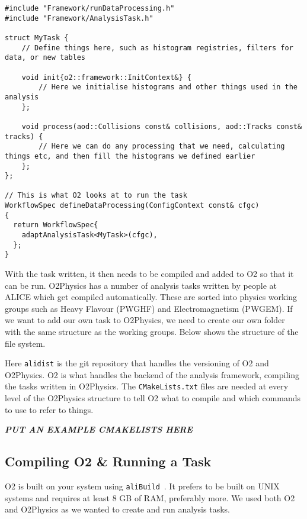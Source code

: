 \begin{verbatim}
#include "Framework/runDataProcessing.h"
#include "Framework/AnalysisTask.h"

struct MyTask {
    // Define things here, such as histogram registries, filters for data, or new tables

    void init{o2::framework::InitContext&} {
        // Here we initialise histograms and other things used in the analysis
    };

    void process(aod::Collisions const& collisions, aod::Tracks const& tracks) {
        // Here we can do any processing that we need, calculating things etc, and then fill the histograms we defined earlier
    };
};

// This is what O2 looks at to run the task
WorkflowSpec defineDataProcessing(ConfigContext const& cfgc)
{
  return WorkflowSpec{
    adaptAnalysisTask<MyTask>(cfgc),
  };
}

\end{verbatim}

With the task written, it then needs to be compiled and added to O2 so that it can be run. O2Physics has a number of analysis tasks written by people at ALICE which get compiled automatically. These are sorted into physics working groups such as Heavy Flavour (PWGHF) and Electromagnetism (PWGEM). If we want to add our own task to O2Physics, we need to create our own folder with the same structure as the working groups. Below shows the structure of the file system.


Here \texttt{alidist} is the git repository that handles the versioning of O2 and O2Physics. O2 is what handles the backend of the analysis framework, compiling the tasks written in O2Physics. The \texttt{CMakeLists.txt} files are needed at every level of the O2Physics structure to tell O2 what to compile and which commands to use to refer to things. 

\textbf{\textit{PUT AN EXAMPLE CMAKELISTS HERE}}



\subsection{Compiling O2 \& Running a Task}\label{sec:CompileRun}
O2 is built on your system using \texttt{aliBuild}~\cite{aliBuild_install}. It prefers to be built on UNIX systems and requires at least 8 GB of RAM, preferably more. We used both O2 and O2Physics as we wanted to create and run analysis tasks. 

